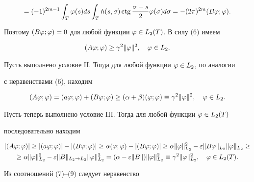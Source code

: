 \begin{pf}
\begin{multline*}
=(-1)^{2m-1}\int_T \vp(s)ds \int_T h(s,\sigma)\ctg


\frac{\sigma-s}{2}\vp(\sigma)d\sigma=


-(2\pi)^{2m}(B\vp;\vp).


\end{multline*}


Поэтому $(B\varphi;\varphi)=0$ для любой функции $\varphi \in L_2(T)$. В силу (6) имеем


\begin{equation}


(A\vp;\vp) \gea \gamma^2 \|\vp\|^2,\quad \vp\in L_2.


\end{equation}





Пусть выполнено условие II. Тогда для любой функции $\varphi\in L_2$, по аналогии 


с неравенствами (6), находим


\begin{equation}


(A\vp;\vp) = (a\vp;\vp)+(B\vp;\vp)\gea (\alpha+\beta)(\vp;\vp) \equiv


\gamma^2\|\vp\|^2,\quad \vp\in L_2.


\end{equation}





Пусть теперь выполнено условие III. Тогда для любой функции $\varphi\in L_2(T)$ 


последовательно находим


\begin{multline}


|(A\vp;\vp)|\gea |(a\vp;\vp)|-|(B\vp;\vp)|\gea \alpha(\vp;\vp) -


|(B\vp;\vp)|\gea \alpha\|\vp\|_{L_2}^2 - \ve \|B\vp\|_{L_2}\|\vp\|_{L_2} \gea \\


%


\gea \alpha\|\vp\|^2_{L_2} - \ve\|B\|_{L_2\to L_2} \|\vp\|_{L_2}^2 =


(\alpha - \ve \|B\|) \|\vp\|_{L_2}^2 \equiv


\gamma^2\|\vp\|_{L_2}^2, \quad \vp \in L_2(T).


\end{multline}





Из соотношений (7)--(9) следует неравенство



\end{pf}
